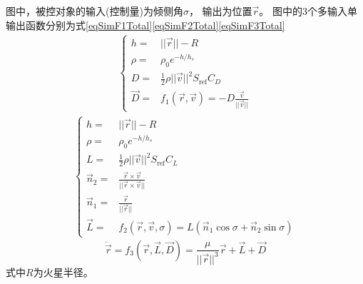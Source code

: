 图中，被控对象的输入(控制量)为倾侧角$\sigma$，
输出为位置$\vec{r}$。
图中的3个多输入单输出函数分别为式\eqref{eqSimF1Total}\eqref{eqSimF2Total}\eqref{eqSimF3Total}
\begin{align}
    \left\{\begin{aligned}
    h =& ||\vec{r}||-R \\
    \rho =& \rho_0e^{-h/h_s} \\
    D =& \frac{1}{2}\rho||\vec{v}||^2S_{\text{ref}}C_D \\
    \vec{D} =& f_1(\vec{r},\vec{v}) = -D\frac{\vec{v}}{||\vec{v}||}
\end{aligned}\right. \label{eqSimF1Total}
\end{align}
\begin{align}
    \left\{\begin{aligned}
    h =& ||\vec{r}||-R \\
    \rho =& \rho_0e^{-h/h_s} \\
    L =& \frac{1}{2}\rho||\vec{v}||^2S_{\text{ref}}C_L \\
    \vec{n}_2 =& \frac{\vec{r}\times\vec{v}}{||\vec{r}\times\vec{v}||} \\
    \vec{n}_1 =& \frac{\vec{r}}{||\vec{r}||} \\
    \vec{L} =& f_2(\vec{r},\vec{v},\sigma) = L(\vec{n}_1\cos\sigma + \vec{n}_2\sin\sigma)
\end{aligned}\right. \label{eqSimF2Total}
\end{align}
\begin{equation}
    \ddot{\vec{r}} = f_3(\vec{r},\vec{L},\vec{D}) = \frac{\mu}{||\vec{r}||^3}\vec{r}+\vec{L}+\vec{D} \label{eqSimF3Total}
\end{equation}
式中$R$为火星半径。


